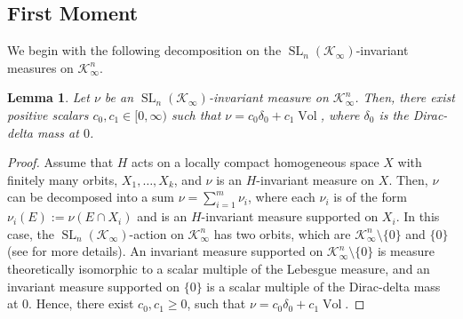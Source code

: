 \documentclass[11pt,a4paper,reqno]{amsart}
\newtheorem{lemma}[theorem]{Lemma}
\theoremstyle{definition}
\theoremstyle{remark}
\numberwithin{equation}{section}
\begin{document}
\subsection{First Moment}
We begin with the following decomposition on the $\operatorname{SL}_n(\mathcal{K}_{\infty})$-invariant measures on $\mathcal K_\infty^n$.
\begin{lemma}
\label{lem:SL_n(K_infty)InvMeas}
    Let $\nu$ be an $\operatorname{SL}_n(\mathcal{K}_{\infty})$-invariant measure on $\mathcal{K}_{\infty}^n$. Then, there exist positive scalars $c_0,c_1\in [0,\infty)$ such that $\nu=c_0\delta_0+c_1\operatorname{Vol}$, where $\delta_0$ is the Dirac-delta mass at $0$.
\end{lemma}
\begin{proof}
    Assume that $H$ acts on a locally compact homogeneous space $X$ with finitely many orbits, $X_1,\dots, X_k$, and $\nu$ is an $H$-invariant measure on $X$. Then, $\nu$ can be decomposed into a sum $\nu=\sum_{i=1}^m\nu_i$, where each $\nu_i$ is of the form $\nu_i(E):=\nu(E\cap X_i)$ and is an $H$-invariant measure supported on $X_i$. In this case, the $\operatorname{SL}_n(\mathcal{K}_{\infty})$-action on $\mathcal{K}_{\infty}^n$ has two orbits, which are $\mathcal{K}_{\infty}^n\setminus \{0\}$ and $\{0\}$ (see \cite{Weil} for more details). An invariant measure supported on $\mathcal{K}_{\infty}^n\setminus\{0\}$ is measure theoretically isomorphic to a scalar multiple of the Lebesgue measure, and an invariant measure supported on $\{0\}$ is a scalar multiple of the Dirac-delta mass at $0$. Hence, there exist $c_0,c_1\geq 0$, such that $\nu=c_0\delta_0+c_1\operatorname{Vol}$.
\end{proof}
\end{document}
